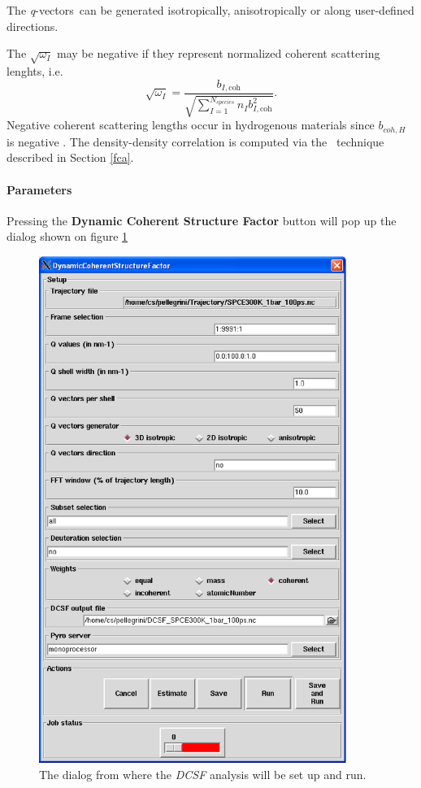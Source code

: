 \documentclass[a4paper,11pt]{report}
\newcommand{\qvects}{\textit{q}-vectors}
\begin{document}
The \qvects\ can be generated isotropically, anisotropically or along user-defined directions.

The $\sqrt{\omega_I}$ may be negative if they represent normalized coherent scattering lenghts, i.e.
\begin{equation}
\sqrt{\omega_I} = \frac{b_{I,\mathrm{coh}}}{\sqrt{\sum_{I = 1}^{N_{species}} n_I b^2_{I,\mathrm{coh}}}}.
\end{equation}
Negative coherent scattering lengths occur in hydrogenous materials since $b_{coh,H}$ is negative \cite{Lovesey}.
The density-density correlation is computed via the \FCA\ technique described in Section \ref{fca}.
\newpage
\paragraph{Parameters\\}
\label{dcsf_parameters}
Pressing the \textbf{Dynamic Coherent Structure Factor} button will pop up the dialog shown on figure \ref{fig:dcsf}
\begin{figure}[h!]
\begin{center}
\includegraphics[width=10cm]{Figures/dcsf.eps}
\end{center}
\caption[The \textit{DCSF} analysis dialog]{The dialog from where the \textit{DCSF} analysis will be set up and run.}
\label{fig:dcsf}
\end{figure}   
\end{document}
